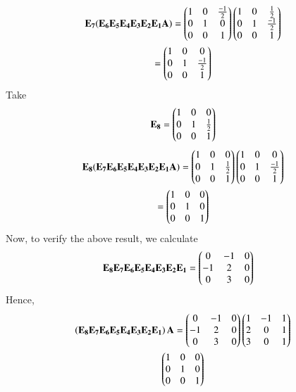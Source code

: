 \documentclass[journal,12pt,twocolumn]{IEEEtran}
\begin{document}
\begin{multline}
	\mathbf{E_7(E_6E_5E_4E_3E_2E_1A)} = \begin{pmatrix}1 & 0 & \frac{-1}{2} \\0 & 1 & 0 \\ 0 & 0 & 1\end{pmatrix}\begin{pmatrix}1 & 0 & \frac{1}{2} \\ 0 & 1 & \frac{-1}{2} \\ 0 & 0 & 1\end{pmatrix}\\
	= \begin{pmatrix}1 & 0 & 0 \\ 0 & 1 & \frac{-1}{2} \\ 0 & 0 & 1\end{pmatrix}
\end{multline}
Take
\begin{align}
	\mathbf{E_8} = \begin{pmatrix}1 & 0 & 0 \\0 & 1 &\frac{1}{2} \\ 0 & 0& 1\end{pmatrix}	
\end{align}
\begin{multline}
	\mathbf{E_8(E_7E_6E_5E_4E_3E_2E_1A)} = \begin{pmatrix}1 & 0 & 0 \\0 & 1 & \frac{1}{2} \\ 0 & 0 & 1\end{pmatrix}\begin{pmatrix}1 & 0 & 0 \\ 0 & 1 & \frac{-1}{2} \\ 0 & 0 & 1\end{pmatrix}\\
	= \begin{pmatrix}1 & 0 & 0 \\0 & 1 & 0 \\ 0 & 0 & 1\end{pmatrix}
\end{multline}
Now, to verify the above result, we calculate
\begin{align}
& \mathbf{E_8E_7E_6E_5E_4E_3E_2E_1}= \begin{pmatrix}0 & -1 & 0 \\ -1 & 2 & 0 \\ 0 & 3 & 0\end{pmatrix} 
\end{align}
Hence,
\begin{multline}
\left(\mathbf{E_8E_7E_6E_5E_4E_3E_2E_1}\right)\mathbf{A} = \begin{pmatrix}0 & -1 & 0 \\ -1 & 2 & 0 \\ 0 & 3 & 0\end{pmatrix}\begin{pmatrix}1 & -1 & 1 \\ 2 & 0 & 1 \\ 3 & 0 & 1\end{pmatrix} \\
\begin{pmatrix}1 & 0 & 0 \\ 0 & 1 & 0 \\ 0 & 0 & 1\end{pmatrix}
\end{multline}
\end{document}
